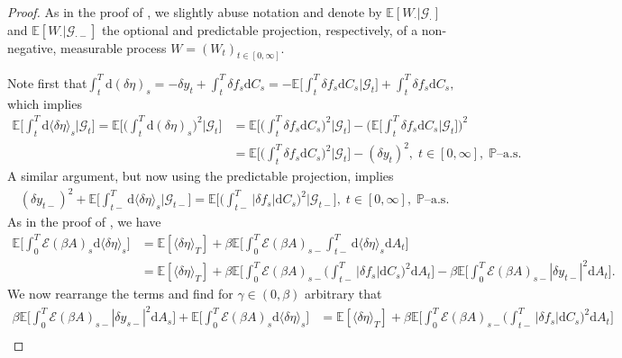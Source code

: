 \documentclass[10pt]{article} %
\newcommand\cE{\mathcal E}
\newcommand\cG{\mathcal G}
\def \E{\mathbb{E}}
\def \P{\mathbb{P}}
\newcommand{\1}{\mathbf{1}}
\def\d{\mathrm{d}}
\begin{document}
\begin{proof}
	As in the proof of , we slightly abuse notation and denote by $\E[W_\cdot| \cG_\cdot]$ and $\E[W_\cdot|\cG_{\cdot-}]$ the optional and predictable projection, respectively, of a non-negative, measurable process $W = (W_t)_{t \in [0,\infty]}$.
	
	\medskip
	Note first that$ \int_t^T \d(\delta\eta)_s = -\delta y_t + \int_t^T \delta f_s \d C_s = - \E\big[\int_t^T \delta f_s \d C_s \big| \cG_t\big] + \int_t^T \delta f_s \d C_s,$ which implies
	\begin{align}\label{eq::cond_delta_eta_bsde}
		\E\bigg[\int_t^T \d\langle\delta\eta\rangle_s\bigg|\cG_t\bigg] = \E\bigg[\bigg(\int_t^T \d(\delta\eta)_s\bigg)^2\bigg|\cG_t\bigg] &= \E\bigg[\bigg(\int_t^T \delta f_s \d C_s\bigg)^2 \bigg| \cG_t\bigg] - \bigg(\E\bigg[\int_t^T \delta f_s \d C_s \bigg| \cG_t\bigg]\bigg)^2 \nonumber\\
		&= \E\bigg[\bigg(\int_t^T \delta f_s \d C_s\bigg)^2 \bigg| \cG_t\bigg] - (\delta y_t)^2, \; t \in [0,\infty], \; \text{$\P$--a.s.}
	\end{align}
	A similar argument, but now using the predictable projection, implies
	\begin{align}\label{eq::cond_delta_eta_bsde_minus}
		(\delta y_{t-})^2 + \E\bigg[\int_{t-}^T \d\langle\delta\eta\rangle_s\bigg|\cG_{t-}\bigg] = \E\bigg[\bigg(\int_{t-}^T |\delta f_s| \d C_s\bigg)^2 \bigg| \cG_{t-}\bigg], \; t \in [0,\infty], \; \text{$\P$--a.s.}
	\end{align}
	As in the proof of , we have
	\begin{align*}
		\E\bigg[\int_0^T \cE(\beta A)_s \d \langle\delta\eta\rangle_s\bigg] 
		&= \E[\langle\delta\eta\rangle_T] + \beta \E\bigg[\int_0^T \cE(\beta A)_{s-}\int_{t-}^T \d\langle\delta\eta\rangle_s\d A_t\bigg] \\
		&= \E[\langle\delta\eta\rangle_T] + \beta \E\bigg[\int_0^T \cE(\beta A)_{s-}\bigg(\int_{t-}^T |\delta f_s|\d C_s\bigg)^2\d A_t\bigg] - \beta \E\bigg[\int_0^T \cE(\beta A)_{s-}|\delta y_{t-}|^2\d A_t\bigg].
	\end{align*}
	We now rearrange the terms and find for $\gamma \in (0,\beta)$ arbitrary that
	\begin{align*}
		\beta \E\bigg[\int_0^T \cE(\beta A)_{s-}|\delta y_{s-}|^2\d A_s\bigg] + \E\bigg[\int_0^T \cE(\beta A)_s \d \langle\delta\eta\rangle_s\bigg] 
		&= \E[\langle\delta\eta\rangle_T] + \beta \E\bigg[\int_0^T \cE(\beta A)_{s-}\bigg(\int_{t-}^T |\delta f_s|\d C_s\bigg)^2\d A_t\bigg] \\

\end{align*}
\end{proof}
\end{document}
